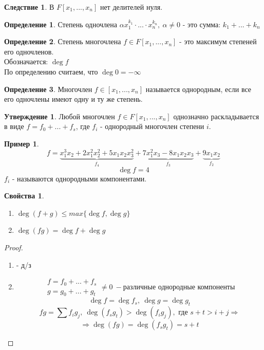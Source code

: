 \documentclass[a4paper, 12pt]{article}
\newcommand\tab[1][.5cm]{\hspace*{#1}}
\theoremstyle{definition}
\newtheorem*{definition}{Определение}
\newtheorem*{consequense}{Следствие}
\newtheorem*{subtheorem}{Утверждение}
\newtheorem*{example1}{Пример}
\newtheorem*{properties}{Свойства}
\begin{document}
  \begin{consequense}
    В $F[x_1,...,x_n]$ нет делителей нуля. 
  \end{consequense}
  \begin{definition}
    Степень одночлена $\alpha x_1^{k_1} \cdot ... \cdot x_n^{k_n}, \ \alpha \neq 0$ - это сумма: $k_1+...+k_n$   
  \end{definition}
  \begin{definition}
    Степень многочлена $f \in F[x_1,...,x_n]$ - это максимум степеней его одночленов.\\
    Обозначается: $\deg f$\\
    По определению считаем, что $\deg 0 = -\infty$   
  \end{definition}
  \begin{definition}
    Многочлен $f \in [x_1,...,x_n]$ называется однородным, если все его одночлены имеют одну и ту же степень. 
  \end{definition}
  \begin{subtheorem}
    Любой многочлен $f \in F[x_1,...,x_n]$ однозначно раскладывается в виде $f = f_0+...+f_s$, где $f_i$ - однородный многочлен степени $i$.   
  \end{subtheorem}
  \begin{example1}
    $$f= \underbrace{x_1^3x_2+2x_1^2x_2^2 + 5x_1x_2x_3^2}_{f_4}  + \underbrace{7x_1^2x_3 - 8x_1x_2x_3}_{f_3} + \underbrace{9x_1x_2}_{f_2}$$
    $$\deg f = 4$$
    $f_i$ - называются однородными компонентами.   
  \end{example1}
  \begin{properties}\tab
    \begin{enumerate}
      \item $\deg (f+g) \leq max \{\deg f, \deg g\}$
      \item $\deg (fg) = \deg f + \deg g$ 
    \end{enumerate}
  \end{properties}
  \begin{proof}\tab
    \begin{enumerate}
      \item - д/з
      \item 
        $$\begin{matrix}
          f = f_0+...+f_s\\
          g = g_0+...+g_t
        \end{matrix} \neq 0 \ - \text{различные однородные компоненты}$$
        $$\deg f = \deg f_s, \ \deg g = \deg g_t$$
        $$fg = \sum f_ig_j, \ \deg (f_sg_t) > \deg (f_ig_j), \text{ где } s+t > i+j \Longrightarrow $$
        $$\Longrightarrow \deg (fg) = \deg (f_sg_t) = s+t$$    
    \end{enumerate}
  \end{proof}
\end{document}
